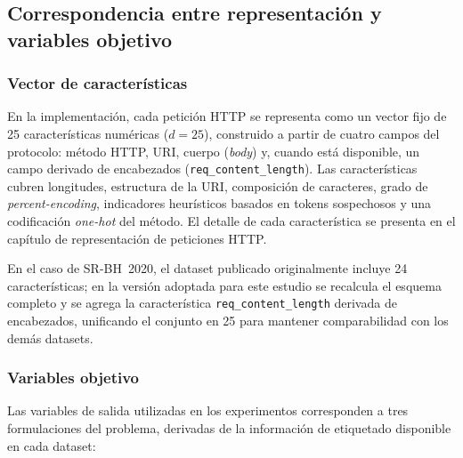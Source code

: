 \documentclass[12pt,oneside]{report}
\begin{document}
\subsection{Correspondencia entre representación y variables objetivo}

\subsubsection{Vector de características}
En la implementación, cada petición HTTP se representa como un vector fijo de 25 características numéricas ($d = 25$), construido a partir de cuatro campos del protocolo: método HTTP, URI, cuerpo (\textit{body}) y, cuando está disponible, un campo derivado de encabezados (\texttt{req\_content\_length}). Las características cubren longitudes, estructura de la URI, composición de caracteres, grado de \textit{percent-encoding}, indicadores heurísticos basados en tokens sospechosos y una codificación \textit{one-hot} del método. El detalle de cada característica se presenta en el capítulo de representación de peticiones HTTP.

En el caso de SR-BH~2020, el dataset publicado originalmente incluye 24 características; en la versión adoptada para este estudio se recalcula el esquema completo y se agrega la característica \texttt{req\_content\_length} derivada de encabezados, unificando el conjunto en 25 para mantener comparabilidad con los demás datasets.

\subsubsection{Variables objetivo}
Las variables de salida utilizadas en los experimentos corresponden a tres formulaciones del problema, derivadas de la información de etiquetado disponible en cada dataset:
\end{document}
